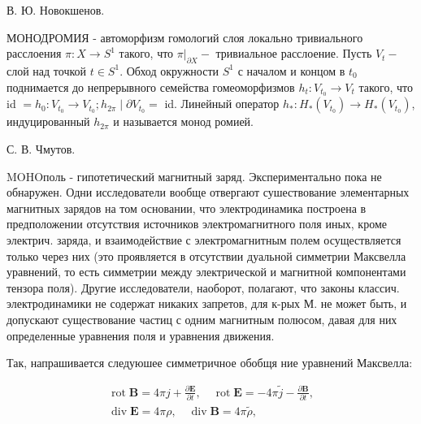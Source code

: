 \documentclass[10pt]{article}
\begin{document}
В. Ю. Новокшенов.



МОНОДРОМИЯ - автоморфизм гомологий слоя локально тривиального расслоения $\pi: X \rightarrow S^{1}$ такого, что $\left.\pi\right|_{\partial X}-$ тривиальное расслоение. Пусть $V_{t}-$ слой над точкой $t \in S^{1}$. Обход окружности $S^{1}$ с началом и концом в $t_{0}$ поднимается до непрерывного семейства гомеоморфизмов $h_{t}: V_{t_{0}} \rightarrow V_{t}$ такого, что id $=h_{0}: V_{t_{0}} \rightarrow V_{t_{0}} ; h_{2 \pi} \mid \partial V_{t_{0}}=$ id. Линейный оператор $h_{*}: H_{*}\left(V_{t_{0}}\right) \rightarrow H_{*}\left(V_{t_{0}}\right)$, индуцированный $h_{2 \pi}$ и называется монод ромией.



С. В. Чмутов.



MOHOполь - гипотетический магнитный заряд. Экспериментально пока не обнаружен. Одни исследователи вообще отвергают сушествование элементарных магнитных зарядов на том основании, что электродинамика построена в предположении отсутствия источников электромагнитного поля иных, кроме электрич. заряда, и взаимодействие с электромагнитным полем осуществляется только через них (это проявляется в отсутствии дуальной симметрии Максвелла уравнений, то есть симметрии между электрической и магнитной компонентами тензора поля). Другие исследователи, наоборот, полагают, что законы классич. электродинамики не содержат никаких запретов, для к-рых М. не может быть, и допускают существование частиц с одним магнитным полюсом, давая для них определенные уравнения поля и уравнения движения.



Так, напрашивается следуюшее симметричное обобщя ние уравнений Максвелла:



\[

\begin{gathered}

\operatorname{rot} \boldsymbol{B}=4 \pi j+\frac{\partial \boldsymbol{E}}{\partial t}, \quad \operatorname{rot} \boldsymbol{E}=-4 \pi \tilde{j}-\frac{\partial \boldsymbol{B}}{\partial t}, \\

\operatorname{div} \boldsymbol{E}=4 \pi \rho, \quad \operatorname{div} \boldsymbol{B}=4 \pi \tilde{\rho},

\end{gathered}

\]
\end{document}
